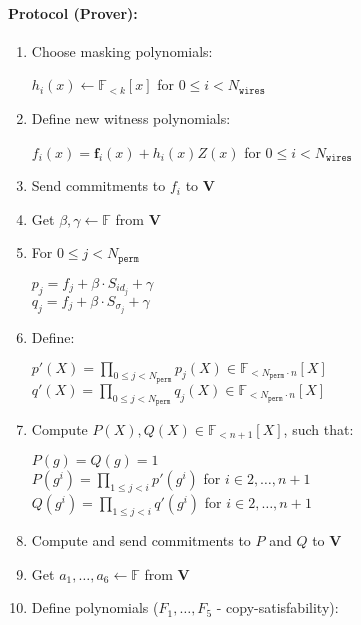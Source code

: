 \paragraph{Protocol (Prover):}
\begin{enumerate}
	\item Choose masking polynomials: 
	\begin{center}
		$h_i(x) \leftarrow \mathbb{F}_{<k}[x]$ for $0 \leq i < N_{\texttt{wires}}$
	\end{center}
	\item Define new witness polynomials:
	\begin{center}
		$f_i(x) = \textbf{f}_{i}(x) + h_i(x)Z(x)$ for $0 \leq i < N_{\texttt{wires}}$
	\end{center}
	\item Send commitments to $f_i$ to $\textbf{V}$
	\item Get $\beta, \gamma \leftarrow \mathbb{F}$ from \textbf{V}
	\item For $0 \leq j < N_{\texttt{perm}}$
	\begin{center}
		$p_j = f_j + \beta \cdot S_{id_j} + \gamma$ \\
		$q_j = f_j + \beta \cdot S_{\sigma_j} + \gamma$
	\end{center}
	\item Define:
	\begin{center}
		$p'(X) = \prod\limits_{0 \leq j < N_{\texttt{perm}}} p_j(X) \in \mathbb{F}_{<N_{\texttt{perm}} \cdot n}[X]$ \\
		$q'(X) = \prod\limits_{0 \leq j < N_{\texttt{perm}}} q_j(X) \in \mathbb{F}_{<N_{\texttt{perm}} \cdot n}[X]$
	\end{center}
	\item Compute $P(X), Q(X) \in \mathbb{F}_{<n+1}[X]$, such that:
	\begin{center}
		$P(g) = Q(g) = 1$ \\
		$P(g^i) = \prod\limits_{1 \leq j < i}p'(g^i)$ for $i \in {2, \dots, n + 1}$ \\
		$Q(g^i) = \prod\limits_{1 \leq j < i}q'(g^i)$ for $i \in {2, \dots, n + 1}$ \\
	\end{center}
	\item Compute and send commitments to $P$ and $Q$ to \textbf{V}
	\item Get $a_1, \dots, a_6 \leftarrow \mathbb{F}$ from \textbf{V}
	\item Define polynomials ($F_1, \dots, F_5$ - copy-satisfability):
	\begin{center}

\end{center}
\end{enumerate}
